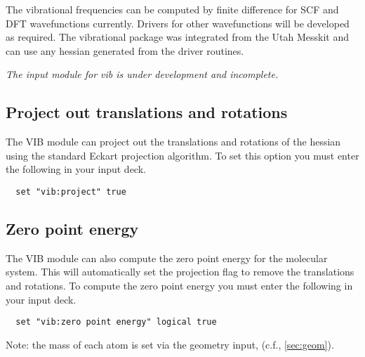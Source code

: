 The vibrational frequencies can be computed by finite difference for
SCF and DFT wavefunctions currently.  Drivers for other wavefunctions
will be developed as required.  The vibrational package was integrated
from the Utah Messkit and can use any hessian generated from the
driver routines.

{\it The input module for vib is under development and incomplete.}

\subsection{Project out translations and rotations}

The VIB module can project out the translations and rotations of the
hessian using the standard Eckart projection algorithm.  To set this
option you must enter the following in your input deck.

\begin{verbatim}
  set "vib:project" true
\end{verbatim}

\subsection{Zero point energy}

The VIB module can also compute the zero point energy for the
molecular system.  This will automatically set the projection flag to
remove the translations and rotations.   To compute the zero point energy
you must enter the following in your input deck.

\begin{verbatim}
  set "vib:zero point energy" logical true
\end{verbatim}

Note: the mass of each atom is set via the geometry input, (c.f.,
\ref{sec:geom}). 
